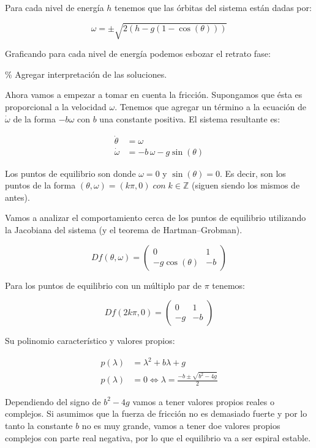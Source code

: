 \documentclass[
]{article}
\begin{document}
Para cada nivel de energía \(h\) tenemos que las órbitas del sistema
están dadas por:

\[
\omega = \pm \sqrt{2\left(h-g\left(1-\cos(\theta)\right)\right)}
\]

Graficando para cada nivel de energía podemos esbozar el retrato fase:

\% Agregar interpretación de las soluciones.

Ahora vamos a empezar a tomar en cuenta la fricción. Supongamos que ésta
es proporcional a la velocidad \(\omega\). Tenemos que agregar un
término a la ecuación de \(\dot{\omega}\) de la forma \(-b \omega\) con
\(b\) una constante positiva. El sistema resultante es:

\[
\begin{aligned}
\dot{\theta} & = \omega \\
\dot{\omega} & = -b \, \omega - g \sin(\theta)
\end{aligned}
\]

Los puntos de equilibrio son donde \(\omega = 0\) y
\(\sin(\theta) = 0\). Es decir, son los puntos de la forma
\((\theta, \omega) = (k \pi, 0) \; con \; k \in \mathbb{Z}\) (siguen
siendo los mismos de antes).

Vamos a analizar el comportamiento cerca de los puntos de equilibrio
utilizando la Jacobiana del sistema (y el teorema de Hartman--Grobman).

\[
Df(\theta, \omega) = \begin{pmatrix}
0 & 1 \\
-g \cos(\theta) & -b
\end{pmatrix}
\]

Para los puntos de equilibrio con un múltiplo par de \(\pi\) tenemos:

\[
Df(2k\pi, 0) = \begin{pmatrix}
0 & 1 \\
-g  & -b
\end{pmatrix}
\]

Su polinomio característico y valores propios:

\[
\begin{aligned}
    p(\lambda) & = \lambda^2 + b \lambda + g \\
    p(\lambda) & = 0 \iff \lambda = \frac{-b \pm \sqrt{b^2-4g}}{2}
\end{aligned}
\]

Dependiendo del signo de \(b^2-4g\) vamos a tener valores propios reales
o complejos. Si asumimos que la fuerza de fricción no es demasiado
fuerte y por lo tanto la constante \(b\) no es muy grande, vamos a tener
doe valores propios complejos con parte real negativa, por lo que el
equilibrio va a ser espiral estable.
\end{document}
